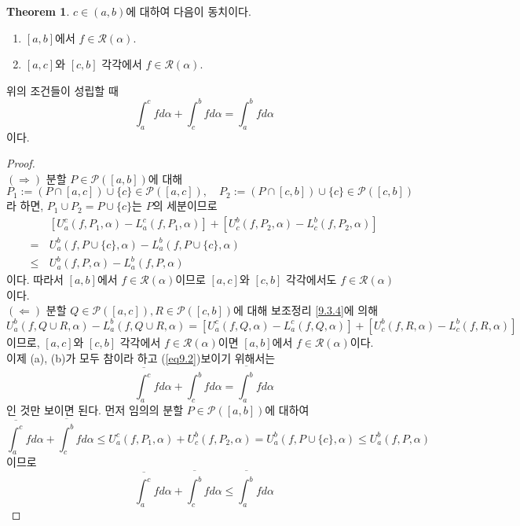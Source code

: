 \documentclass[11pt]{book}
\numberwithin{equation}{chapter}
\def\calP{\mathcal{P}}
\def\calR{\mathcal{R}}
\newcommand{\upint}[2]{\overline{\int_{#1}^{#2}}}
\theoremstyle{definition}
\newtheorem{thm}{Theorem}[section]
\newenvironment{enum}
	{\begin{enumerate}[label=(\alph*), leftmargin=2\parindent]}
	{\end{enumerate}}
\begin{document}
\begin{thm} \label{9.3.7}
    \(c \in (a, b)\)에 대하여 다음이 동치이다.
    \begin{enum}
        \item \([a, b]\)에서 \(f \in \calR(\alpha)\).
        \item \([a, c]\)와 \([c, b]\) 각각에서 \(f \in \calR(\alpha)\).
    \end{enum}
    위의 조건들이 성립할 때
    \begin{equation} \label{eq9.2}
        \int_a^c f d\alpha + \int_c^b f d\alpha = \int_a^b f d\alpha
    \end{equation}
    이다.
\end{thm}
\begin{proof}
    \quad\\
    \((\Rightarrow)\) 분할 \(P \in \calP([a, b])\)에 대해
    \[
        P_1 := (P \cap [a, c]) \cup \{c\} \in \calP([a, c]), \quad P_2 := (P \cap [c, b]) \cup \{c\} \in \calP([c, b])
    \]
    라 하면, \(P_1 \cup P_2 = P \cup \{c\}\)는 \(P\)의 세분이므로
    \begin{align*}
        & [U_a^c(f, P_1, \alpha) - L_a^c(f, P_1, \alpha)] + [U_c^b(f, P_2, \alpha) - L_c^b(f, P_2, \alpha)] \\
        =\,& U_a^b(f, P \cup \{c\}, \alpha) - L_a^b(f, P \cup \{c\}, \alpha)\\
        \le\,& U_a^b(f, P, \alpha) - L_a^b(f, P, \alpha)
    \end{align*}
    이다. 따라서 \([a, b]\)에서 \(f \in \calR(\alpha)\)이므로 \([a, c]\)와 \([c, b]\) 각각에서도 \(f \in \calR(\alpha)\)이다.\\
    \((\Leftarrow)\) 분할 \(Q \in \calP([a, c]), R \in \calP([c, b])\)에 대해 보조정리 \ref{9.3.4}에 의해
    \[
        U_a^b(f, Q \cup R, \alpha) - L_a^b(f, Q \cup R, \alpha) = [U_a^c(f, Q, \alpha) - L_a^c(f, Q, \alpha)] + [U_c^b(f, R, \alpha) - L_c^b(f, R, \alpha)]
    \]
    이므로, \([a, c]\)와 \([c, b]\) 각각에서 \(f \in \calR(\alpha)\)이면 \([a, b]\)에서 \(f \in \calR(\alpha)\)이다.\\
    이제 (a), (b)가 모두 참이라 하고 (\ref{eq9.2})\를 보이기 위해서는
    \[
        \upint{a}{c} f d\alpha + \upint{c}{b} f d\alpha = \upint{a}{b} f d\alpha
    \]
    인 것만 보이면 된다. 먼저 임의의 분할 \(P \in \calP([a, b])\)에 대하여
    \[
        \upint{a}{c} f d\alpha + \upint{c}{b} f d\alpha \le U_a^c(f, P_1, \alpha) + U_c^b(f, P_2, \alpha) = U_a^b(f, P \cup \{c\}, \alpha) \le U_a^b(f, P, \alpha)
    \]
    이므로
    \[
        \upint{a}{c} f d\alpha + \upint{c}{b} f d\alpha \le \upint{a}{b} f d\alpha
\]
\end{proof}
\end{document}

